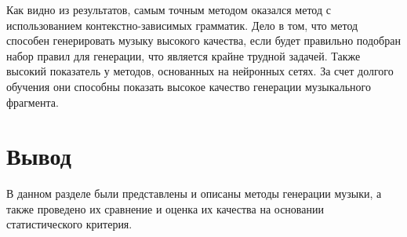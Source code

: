 Как видно из результатов, самым точным методом оказался метод с использованием контекстно-зависимых грамматик. Дело в том, что метод способен генерировать музыку высокого качества, если будет правильно подобран набор правил для генерации, что является крайне трудной задачей. Также высокий показатель у методов, основанных на нейронных сетях. За счет долгого обучения они способны показать высокое качество генерации музыкального фрагмента.


\section{Вывод}

В данном разделе были представлены и описаны методы генерации музыки, а также проведено их сравнение и оценка их качества на основании статистического критерия.
